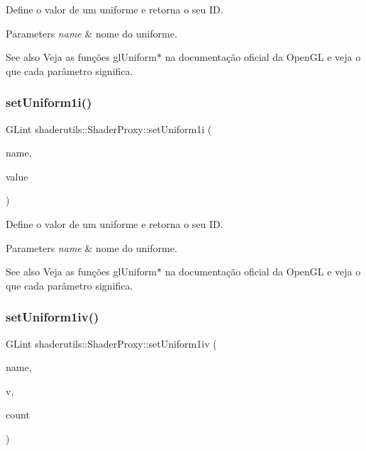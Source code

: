 Define o valor de um uniforme e retorna o seu ID. 
\begin{DoxyParams}{Parameters}
{\em name} & nome do uniforme. \\
\hline
\end{DoxyParams}
\begin{DoxySeeAlso}{See also}
Veja as funções gl\+Uniform$\ast$ na documentação oficial da Open\+GL e veja o que cada parâmetro significa. 
\end{DoxySeeAlso}
\mbox{\label{classshaderutils_1_1_shader_proxy_add169bd98e695851e04cf6a46c3cc3a1}} 
\subsubsection{\texorpdfstring{set\+Uniform1i()}{setUniform1i()}}
{\footnotesize\ttfamily G\+Lint shaderutils\+::\+Shader\+Proxy\+::set\+Uniform1i (\begin{DoxyParamCaption}\item[{const char $\ast$}]{name,  }\item[{G\+Lint}]{value }\end{DoxyParamCaption})\hspace{0.3cm}{\ttfamily [inline]}}

Define o valor de um uniforme e retorna o seu ID. 
\begin{DoxyParams}{Parameters}
{\em name} & nome do uniforme. \\
\hline
\end{DoxyParams}
\begin{DoxySeeAlso}{See also}
Veja as funções gl\+Uniform$\ast$ na documentação oficial da Open\+GL e veja o que cada parâmetro significa. 
\end{DoxySeeAlso}
\mbox{\label{classshaderutils_1_1_shader_proxy_a6a9b8a7ff2d0415e427ef002a1005a2d}} 
\subsubsection{\texorpdfstring{set\+Uniform1iv()}{setUniform1iv()}}
{\footnotesize\ttfamily G\+Lint shaderutils\+::\+Shader\+Proxy\+::set\+Uniform1iv (\begin{DoxyParamCaption}\item[{const char $\ast$}]{name,  }\item[{const G\+Lint $\ast$}]{v,  }\item[{G\+Luint}]{count }\end{DoxyParamCaption})\hspace{0.3cm}{\ttfamily [inline]}}

